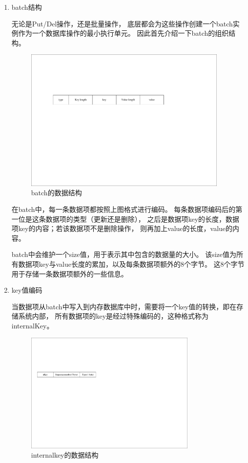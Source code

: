 \begin{enumerate}
		\item batch结构
		
		无论是Put/Del操作，还是批量操作，
		底层都会为这些操作创建一个batch实例作为一个数据库操作的最小执行单元。
		因此首先介绍一下batch的组织结构。

		\begin{figure}[H]
			\centering
			\includegraphics[width=0.95\textwidth]{pdf/batch.pdf}
			\caption{batch的数据结构}
			\label{batch}
		\end{figure}

		在batch中，每一条数据项都按照上图格式进行编码。
		每条数据项编码后的第一位是这条数据项的类型（更新还是删除），
		之后是数据项key的长度，数据项key的内容；若该数据项不是删除操作，
		则再加上value的长度，value的内容。

		batch中会维护一个size值，用于表示其中包含的数据量的大小。
		该size值为所有数据项key与value长度的累加，以及每条数据项额外的8个字节。
		这8个字节用于存储一条数据项额外的一些信息。
		

		\item key值编码
		
		当数据项从batch中写入到内存数据库中时，需要将一个key值的转换，即在存储系统内部，
		所有数据项的key是经过特殊编码的，这种格式称为internalKey。

		\begin{figure}[H]
			\centering
			\includegraphics[width=0.80\textwidth]{pdf/internalkey.pdf}
			\caption{internalkey的数据结构}
			\label{internalkey_1}
		\end{figure}



\end{enumerate}
